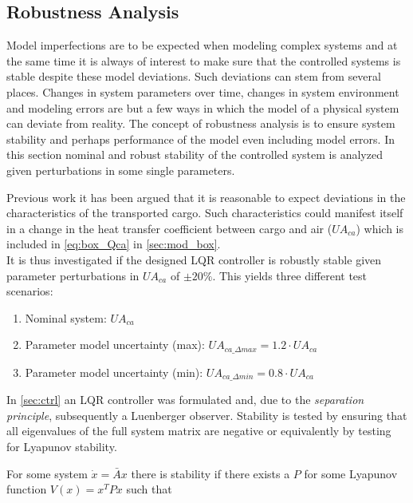 \subsection{Robustness Analysis}\label{sec:robustness-analysis}

Model imperfections are to be expected when modeling complex systems and at the same time it is always of interest to make sure that the controlled systems is stable despite these model deviations. Such deviations can stem from several places. Changes in system parameters over time, changes in system environment and modeling errors are but a few ways in which the model of a physical system can deviate from reality. The concept of robustness analysis is to ensure system stability and perhaps performance of the model even including model errors. In this section nominal and robust stability of the controlled system is analyzed given perturbations in some single parameters.

Previous work \cite{Borlum2016} it has been argued that it is reasonable to expect deviations in the characteristics of the transported cargo. Such characteristics could manifest itself in a change in the heat transfer coefficient between cargo and air ($U A_{ca}$) which is included in \cref{eq:box_Qca} in \cref{sec:mod_box}.\\

\noindent It is thus investigated if the designed LQR controller is robustly stable given parameter perturbations in $U A_{ca}$ of $\pm 20 \%$. This yields three different test scenarios:

\begin{enumerate}
	\item Nominal system: $U A_{ca}$
	\item Parameter model uncertainty (max): $U A_{ca\_\Delta max} = 1.2 \cdot U A_{ca}$
	\item Parameter model uncertainty (min): $U A_{ca\_\Delta min} = 0.8 \cdot U A_{ca}$
\end{enumerate}

\smallskip

\noindent In \cref{sec:ctrl} an LQR controller was formulated and, due to the \textit{separation principle}, subsequently a Luenberger observer. Stability is tested by ensuring that all eigenvalues of the full system matrix are negative or equivalently by testing for Lyapunov stability.

\noindent For some system $\dot{x} = \bar{A}x$ there is stability if there exists a $P$ for some Lyapunov function $V(x) = x^TPx$ such that

